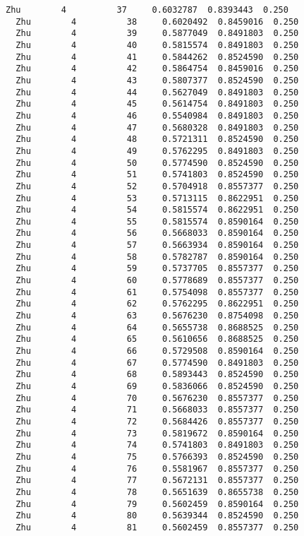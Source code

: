 \documentclass[11pt]{article}
\begin{document}
\begin{Verbatim}[commandchars=\\\{\}]
  Zhu        4          37     0.6032787  0.8393443  0.250
  Zhu        4          38     0.6020492  0.8459016  0.250
  Zhu        4          39     0.5877049  0.8491803  0.250
  Zhu        4          40     0.5815574  0.8491803  0.250
  Zhu        4          41     0.5844262  0.8524590  0.250
  Zhu        4          42     0.5864754  0.8459016  0.250
  Zhu        4          43     0.5807377  0.8524590  0.250
  Zhu        4          44     0.5627049  0.8491803  0.250
  Zhu        4          45     0.5614754  0.8491803  0.250
  Zhu        4          46     0.5540984  0.8491803  0.250
  Zhu        4          47     0.5680328  0.8491803  0.250
  Zhu        4          48     0.5721311  0.8524590  0.250
  Zhu        4          49     0.5762295  0.8491803  0.250
  Zhu        4          50     0.5774590  0.8524590  0.250
  Zhu        4          51     0.5741803  0.8524590  0.250
  Zhu        4          52     0.5704918  0.8557377  0.250
  Zhu        4          53     0.5713115  0.8622951  0.250
  Zhu        4          54     0.5815574  0.8622951  0.250
  Zhu        4          55     0.5815574  0.8590164  0.250
  Zhu        4          56     0.5668033  0.8590164  0.250
  Zhu        4          57     0.5663934  0.8590164  0.250
  Zhu        4          58     0.5782787  0.8590164  0.250
  Zhu        4          59     0.5737705  0.8557377  0.250
  Zhu        4          60     0.5778689  0.8557377  0.250
  Zhu        4          61     0.5754098  0.8557377  0.250
  Zhu        4          62     0.5762295  0.8622951  0.250
  Zhu        4          63     0.5676230  0.8754098  0.250
  Zhu        4          64     0.5655738  0.8688525  0.250
  Zhu        4          65     0.5610656  0.8688525  0.250
  Zhu        4          66     0.5729508  0.8590164  0.250
  Zhu        4          67     0.5774590  0.8491803  0.250
  Zhu        4          68     0.5893443  0.8524590  0.250
  Zhu        4          69     0.5836066  0.8524590  0.250
  Zhu        4          70     0.5676230  0.8557377  0.250
  Zhu        4          71     0.5668033  0.8557377  0.250
  Zhu        4          72     0.5684426  0.8557377  0.250
  Zhu        4          73     0.5819672  0.8590164  0.250
  Zhu        4          74     0.5741803  0.8491803  0.250
  Zhu        4          75     0.5766393  0.8524590  0.250
  Zhu        4          76     0.5581967  0.8557377  0.250
  Zhu        4          77     0.5672131  0.8557377  0.250
  Zhu        4          78     0.5651639  0.8655738  0.250
  Zhu        4          79     0.5602459  0.8590164  0.250
  Zhu        4          80     0.5639344  0.8524590  0.250
  Zhu        4          81     0.5602459  0.8557377  0.250

\end{Verbatim}
\end{document}
